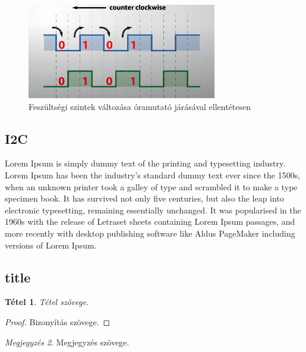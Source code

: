 \documentclass[
]{thesis-ekf}
\newtheorem{tetel}{Tétel}[chapter]
\theoremstyle{definition}
\theoremstyle{remark}
\newtheorem{megjegyzes}[tetel]{Megjegyzés}
\begin{document}
			\begin{figure}[h]
				\centering
				\includegraphics[scale=1.2]{./images/fullencback}
				\caption{Feszültségi szintek változása óramutató járásával ellentétesen\cite{youtubeenc}}
				\label{fig:fullencback}
			\end{figure}
		\clearpage
		\subsection{I2C}
			\par Lorem Ipsum is simply dummy text of the printing and typesetting industry. Lorem Ipsum has been the industry's standard dummy text ever since the 1500s, when an unknown printer took a galley of type and scrambled it to make a type specimen book. It has survived not only five centuries, but also the leap into electronic typesetting, remaining essentially unchanged. It was popularised in the 1960s with the release of Letraset sheets containing Lorem Ipsum passages, and more recently with desktop publishing software like Aldus PageMaker including versions of Lorem Ipsum.
		\subsection{title}

\begin{tetel}
Tétel szövege.
\end{tetel}

\begin{proof}
Bizonyítás szövege.
\end{proof}

\begin{megjegyzes}
Megjegyzés szövege.
\end{megjegyzes}
\end{document}
